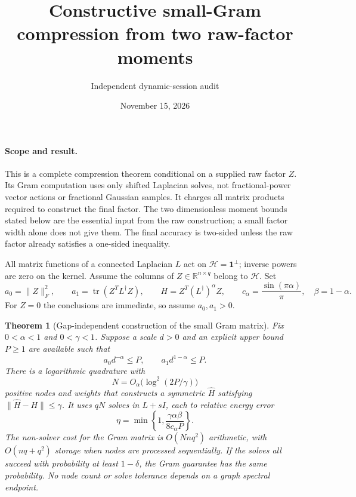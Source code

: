 \documentclass[11pt]{article}
\title{Constructive small-Gram compression from two raw-factor moments}
\author{Independent dynamic-session audit}
\date{November 15, 2026}
\newtheorem{theorem}{Theorem}
\newcommand{\tr}{\operatorname{tr}}
\newcommand{\R}{\mathbb R}
\begin{document}
\maketitle

\paragraph{Scope and result.}
This is a complete compression theorem conditional on a supplied raw
factor $Z$.  Its Gram computation uses only shifted Laplacian solves,
not fractional-power vector actions or fractional Gaussian samples.
It charges all matrix products required to construct the final factor.
The two dimensionless moment bounds stated below are the essential
input from the raw construction; a small factor width alone does not
give them.  The final accuracy is two-sided unless the raw factor
already satisfies a one-sided inequality.

All matrix functions of a connected Laplacian $L$ act on
$\mathcal H=\mathbf1^\perp$; inverse powers are zero on the kernel.
Assume the columns of $Z\in\R^{n\times q}$ belong to $\mathcal H$.
Set
\[
 a_0=\|Z\|_F^2,\qquad
 a_1=\tr(Z^TL^\dagger Z),\qquad
 H=Z^T(L^\dagger)^\alpha Z,\qquad
 c_\alpha=\frac{\sin(\pi\alpha)}\pi,
 \quad\beta=1-\alpha.
\]
For $Z=0$ the conclusions are immediate, so assume $a_0,a_1>0$.

\begin{theorem}[Gap-independent construction of the small Gram matrix]
Fix $0<\alpha<1$ and $0<\gamma<1$.  Suppose a scale $d>0$ and an
explicit upper bound $P\ge1$ are available such that
\[
 a_0d^{-\alpha}\le P,\qquad a_1d^{1-\alpha}\le P.
\]
There is a logarithmic quadrature with
\[
 N=O_\alpha\bigl(\log^2(2P/\gamma)\bigr)
\]
positive nodes and weights that constructs a symmetric
$\widehat H$ satisfying
$\|\widehat H-H\|\le\gamma$.
It uses $qN$ solves in $L+sI$, each to relative energy error
\[
 \eta=\min\left\{1,\frac{\gamma\alpha\beta}{8c_\alpha P}\right\}.
\]
The non-solver cost for the Gram matrix is $O(Nnq^2)$ arithmetic,
with $O(nq+q^2)$ storage when nodes are processed sequentially.
If the solves all succeed with probability at least $1-\delta$,
the Gram guarantee has the same probability.
No node count or solve tolerance depends on a graph spectral endpoint.
\end{theorem}
\end{document}
